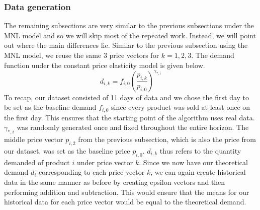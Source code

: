\documentclass[a4paper]{article}
\begin{document}
\subsubsection{Data generation}
The remaining subsections are very similar to the previous subsections under the MNL model and so we will skip most of the repeated work. Instead, we will point out where the main differences lie.
\newline
\newline
Similar to the previous subsection using the MNL model, we reuse the same 3 price vectors for $k = 1,2,3$. The demand function under the constant price elasticity model is given below. 
\[d_{i,k} = f_{i,0} \left(\frac{p_{i,k}}{p_{i,0}}\right)^{\gamma_{*,i}} \]
To recap, our dataset consisted of 11 days of data and we chose the first day to be set as the baseline demand $f_{i,0}$ since every product was sold at least once on the first day. This ensures that the starting point of the algorithm uses real data. $\gamma_{*,i}$ was randomly generated once and fixed throughout the entire horizon. The middle price vector $p_{i,2}$ from the previous subsection, which is also the price from our dataset, was set as the baseline price $p_{i,0}.$ $d_{i,k}$ thus refers to the quantity demanded of product $i$ under price vector $k$.
\newline
\newline
Since we now have our theoretical demand $d_i$ corresponding to each price vector $k$, we can again create historical data in the same manner as before by creating epsilon vectors and then performing addition and subtraction. This would ensure that the means for our historical data for each price vector would be equal to the theoretical demand.
\end{document}
